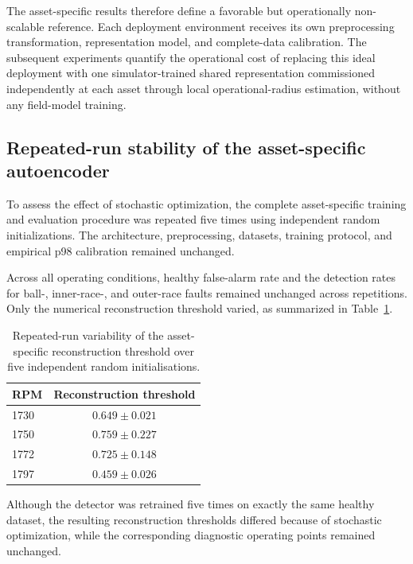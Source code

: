 \documentclass[numbered]{trbunofficial}
\begin{document}
The asset-specific results therefore define a favorable but operationally
non-scalable reference. Each deployment environment receives its own
preprocessing transformation, representation model, and complete-data
calibration. The subsequent experiments quantify the operational cost of
replacing this ideal deployment with one simulator-trained shared
representation commissioned independently at each asset through local
operational-radius estimation, without any field-model training.


\subsection{Repeated-run stability of the asset-specific autoencoder}
\label{sec:ae-stability}

To assess the effect of stochastic optimization, the complete
asset-specific training and evaluation procedure was repeated five times
using independent random initializations. The architecture,
preprocessing, datasets, training protocol, and empirical p98 calibration
remained unchanged.

Across all operating conditions, healthy false-alarm rate and the
detection rates for ball-, inner-race-, and outer-race faults remained
unchanged across repetitions. Only the numerical reconstruction threshold
varied, as summarized in Table~\ref{tab:ae-threshold-stability}.

\begin{table}[!ht]
\centering
\caption{Repeated-run variability of the asset-specific reconstruction
threshold over five independent random initialisations.}
\label{tab:ae-threshold-stability}
\begin{tabular}{lc}
\toprule
RPM & Reconstruction threshold \\
\midrule
1730 & $0.649 \pm 0.021$ \\
1750 & $0.759 \pm 0.227$ \\
1772 & $0.725 \pm 0.148$ \\
1797 & $0.459 \pm 0.026$ \\
\bottomrule
\end{tabular}
\end{table}

Although the detector was retrained five times on exactly the same healthy
dataset, the resulting reconstruction thresholds differed because of
stochastic optimization, while the corresponding diagnostic operating
points remained unchanged.
\end{document}
